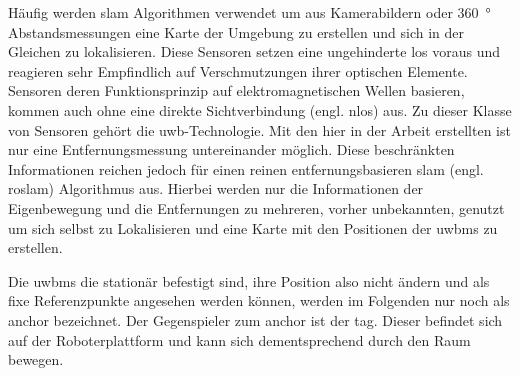 Häufig werden \Gls{slam} Algorithmen verwendet um aus Kamerabildern oder \SI{360}{\degree} Abstandsmessungen eine Karte der Umgebung zu erstellen und sich in der Gleichen zu lokalisieren. Diese Sensoren setzen eine ungehinderte \Gls{los} voraus und reagieren sehr Empfindlich auf Verschmutzungen ihrer optischen Elemente. Sensoren deren Funktionsprinzip auf elektromagnetischen Wellen basieren, kommen auch ohne eine direkte Sichtverbindung (engl. \Gls{nlos}) aus. Zu dieser Klasse von Sensoren gehört die \Gls{uwb}-Technologie. Mit den hier in der Arbeit erstellten  ist nur eine Entfernungsmessung untereinander möglich. Diese beschränkten Informationen reichen jedoch für einen reinen entfernungsbasieren \Gls{slam} (engl. \gls{roslam}) Algorithmus aus. Hierbei werden nur die Informationen der Eigenbewegung und die Entfernungen zu mehreren, vorher unbekannten,  genutzt um sich selbst zu Lokalisieren und eine Karte mit den Positionen der \Glspl{uwbm} zu erstellen.

Die \Glspl{uwbm} die stationär befestigt sind, ihre Position also nicht ändern und als fixe Referenzpunkte angesehen werden können, werden im Folgenden nur noch als \Gls{anchor} bezeichnet. Der Gegenspieler zum \Gls{anchor} ist der \Gls{tag}. Dieser befindet sich auf der Roboterplattform und kann sich dementsprechend durch den Raum bewegen.


%
%
%


%
%
%


%
%

